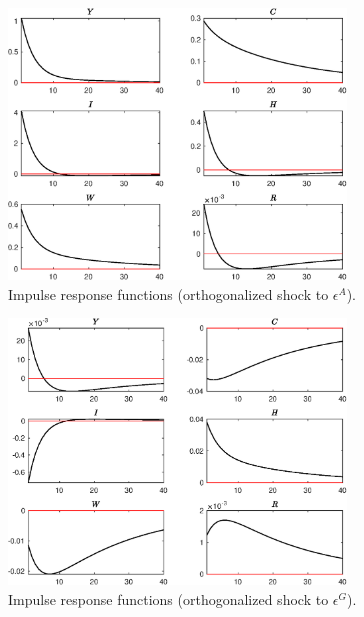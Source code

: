 
\begin{figure}[H]
\centering 
\includegraphics[width=0.80\textwidth]{RBClinear_basic/graphs/RBClinear_basic_IRF_epsA}
\caption{Impulse response functions (orthogonalized shock to ${\epsilon^{A}}$).}
\label{Fig:IRF:epsA}
\end{figure}
 
\begin{figure}[H]
\centering 
\includegraphics[width=0.80\textwidth]{RBClinear_basic/graphs/RBClinear_basic_IRF_epsG}
\caption{Impulse response functions (orthogonalized shock to ${\epsilon^{G}}$).}
\label{Fig:IRF:epsG}
\end{figure}
 
 

